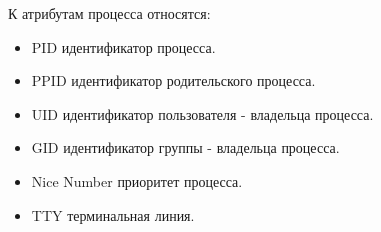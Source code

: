 К атрибутам процесса относятся:

\begin{itemize}
	\item \begin{defi}{PID}		
		идентификатор процесса.
	\end{defi}

	\item \begin{defi}{PPID}		
		идентификатор родительского процесса.
	\end{defi}

	\item \begin{defi}{UID}		
		идентификатор пользователя - владельца процесса.
	\end{defi}

	\item \begin{defi}{GID} 		
		идентификатор группы - владельца процесса.
	\end{defi}

	\item \begin{defi}{Nice Number}	
		приоритет процесса.
	\end{defi}

	\item \begin{defi}{TTY}		
		терминальная линия.
	\end{defi}
\end{itemize}